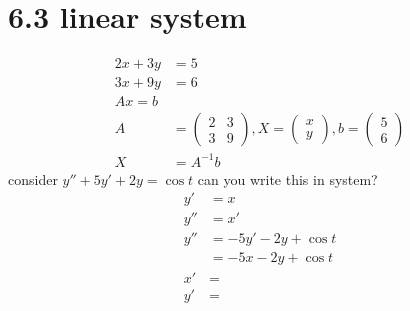 \documentclass{article}
\begin{document}
\section*{6.3 linear system}
\begin{align*}
  2x+3y&=5\\
  3x+9y&=6\\
  Ax=b\\
  A&=\left(\begin{array}{cc}2&3\\3&9\end{array}\right),X=\left(\begin{array}{c}x\\y\end{array}\right),b=\left(\begin{array}{c}5\\6\end{array}\right)\\
  X&=A^{-1}b
\end{align*}
consider $y''+5y'+2y=\cos t$ can you write this in system?
\begin{align*}
  y'&=x\\
  y''&=x'\\
  y''&=-5y'-2y+\cos t\\
  &=-5x-2y+\cos t\\
  x'&=\\
  y'&=
\end{align*}
\end{document}
